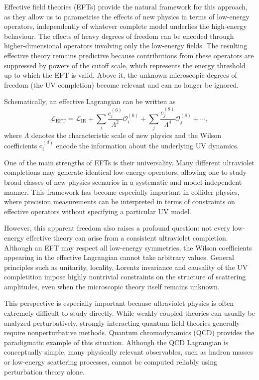 Effective field theories (EFTs) provide the natural framework for this approach, as they allow us to parametrise the effects of new physics in terms of low-energy operators, independently of whatever complete model underlies the high-energy behaviour. The effects of heavy degrees of freedom can be encoded through higher-dimensional operators involving only the low-energy fields. The resulting effective theory remains predictive because contributions from these operators are suppressed by powers of the cutoff scale, which represents the energy threshold up to which the EFT is valid. Above it, the unknown microscopic degrees of freedom (the UV completion) become relevant and can no longer be ignored.

Schematically, an effective Lagrangian can be written as
\[
\mathcal{L}_{\mathrm{EFT}}
=
\mathcal{L}_{\mathrm{IR}}
+
\sum_i \frac{c_i^{(6)}}{\Lambda^2}\mathcal{O}_i^{(6)}
+
\sum_j \frac{c_j^{(8)}}{\Lambda^4}\mathcal{O}_j^{(8)}
+\cdots,
\]
where \(\Lambda\) denotes the characteristic scale of new physics and the Wilson coefficients \(c_i^{(d)}\) encode the information about the underlying UV dynamics.

One of the main strengths of EFTs is their universality. Many different ultraviolet completions may generate identical low-energy operators, allowing one to study broad classes of new physics scenarios in a systematic and model-independent manner. This framework has become especially important in collider physics, where precision measurements can be interpreted in terms of constraints on effective operators without specifying a particular UV model.

However, this apparent freedom also raises a profound question: not every low-energy effective theory can arise from a consistent ultraviolet completion. Although an EFT may respect all low-energy symmetries, the Wilson coefficients appearing in the effective Lagrangian cannot take arbitrary values. General principles such as unitarity, locality, Lorentz invariance and causality of the UV completition impose highly nontrivial constraints on the structure of scattering amplitudes, even when the microscopic theory itself remains unknown.

This perspective is especially important because ultraviolet physics is often extremely
difficult to study directly. While weakly coupled theories can usually be analyzed
perturbatively, strongly interacting quantum field theories generally require
nonperturbative methods. Quantum chromodynamics (QCD) provides the paradigmatic
example of this situation. Although the QCD Lagrangian is conceptually simple,
many physically relevant observables, such as hadron masses or low-energy scattering
processes, cannot be computed reliably using perturbation theory alone.

